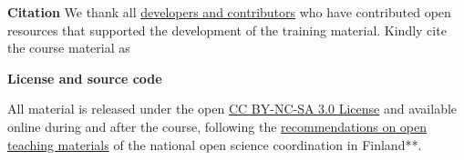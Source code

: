 \documentclass[
  oneside]{book}
\begin{document}
\textbf{Citation} We thank all \href{https://microbiome.github.io}{developers and contributors} who have contributed open resources that supported the development of the training material. Kindly cite the course material as \citet{miacourse}

\textbf{License and source code}

All material is released under the open \href{LICENSE}{CC BY-NC-SA 3.0
License} and available online during and after the course,
following the \href{https://avointiede.fi/fi/linjaukset-ja-aineistot/kotimaiset-linjaukset/oppimisen-ja-oppimateriaalien-avoimuuden-linjaus}{recommendations on open teaching
materials}
of the national open science coordination in Finland**.

  
\end{document}
